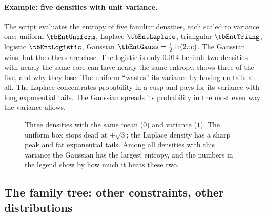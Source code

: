 \paragraph{Example: five densities with unit variance.} The script evaluates the entropy of five familiar densities, each scaled to variance one: uniform $\tbEntUniform$, Laplace $\tbEntLaplace$, triangular $\tbEntTriang$, logistic $\tbEntLogistic$, Gaussian $\tbEntGauss=\frac12\ln(2\pi e)$. The Gaussian wins, but the others are close. The logistic is only $0.014$ behind: two densities with nearly the same core can have nearly the same entropy.  shows three of the five, and why they lose. The uniform ``wastes'' its variance by having no tails at all. The Laplace concentrates probability in a cusp and pays for its variance with long exponential tails. The Gaussian spreads its probability in the most even way the variance allows.

\begin{figure}[htbp]
\centering
{}
\caption{Three densities with the same mean ($0$) and variance ($1$). The uniform box stops dead at $\pm\sqrt3$; the Laplace density has a sharp peak and fat exponential tails. Among all densities with this variance the Gaussian has the largest entropy, and the numbers in the legend show by how much it beats these two.}
\label{2b:fig:unitvar}
\end{figure}

\subsection{The family tree: other constraints, other distributions}
\label{2b:sec:maxent-family}

